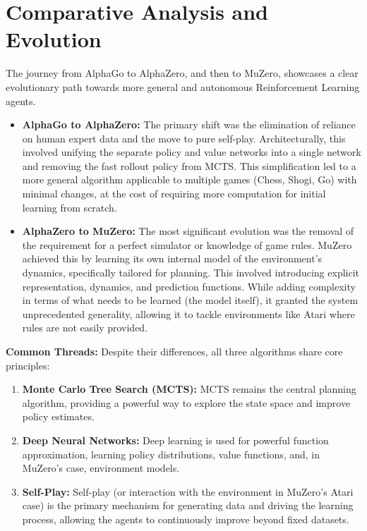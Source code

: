 \documentclass[11pt,a4paper]{article}
\begin{document}
\section{Comparative Analysis and Evolution}
The journey from AlphaGo to AlphaZero, and then to MuZero, showcases a clear evolutionary path towards more general and autonomous Reinforcement Learning agents.
\begin{itemize}
    \item \textbf{AlphaGo to AlphaZero:} The primary shift was the elimination of reliance on human expert data and the move to pure self-play. Architecturally, this involved unifying the separate policy and value networks into a single network and removing the fast rollout policy from MCTS. This simplification led to a more general algorithm applicable to multiple games (Chess, Shogi, Go) with minimal changes, at the cost of requiring more computation for initial learning from scratch.
    \item \textbf{AlphaZero to MuZero:} The most significant evolution was the removal of the requirement for a perfect simulator or knowledge of game rules. MuZero achieved this by learning its own internal model of the environment's dynamics, specifically tailored for planning. This involved introducing explicit representation, dynamics, and prediction functions. While adding complexity in terms of what needs to be learned (the model itself), it granted the system unprecedented generality, allowing it to tackle environments like Atari where rules are not easily provided.
\end{itemize}

\textbf{Common Threads:}
Despite their differences, all three algorithms share core principles:
\begin{enumerate}
    \item \textbf{Monte Carlo Tree Search (MCTS):} MCTS remains the central planning algorithm, providing a powerful way to explore the state space and improve policy estimates.
    \item \textbf{Deep Neural Networks:} Deep learning is used for powerful function approximation, learning policy distributions, value functions, and, in MuZero's case, environment models.
    \item \textbf{Self-Play:} Self-play (or interaction with the environment in MuZero's Atari case) is the primary mechanism for generating data and driving the learning process, allowing the agents to continuously improve beyond fixed datasets.
\end{enumerate}
\end{document}
